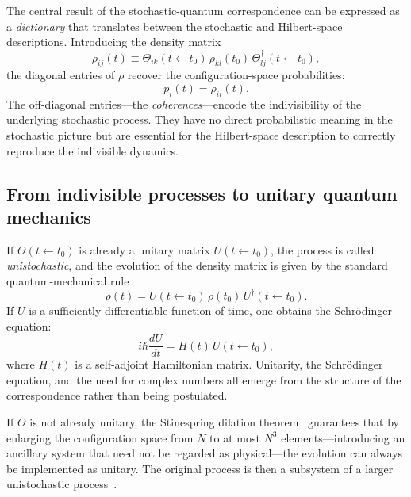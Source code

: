 \documentclass[aps,prd,twocolumn,superscriptaddress,nofootinbib]{revtex4-2}
\begin{document}
The central result of the stochastic-quantum correspondence can be expressed as a \emph{dictionary} that translates between the stochastic and Hilbert-space descriptions. Introducing the density matrix
\begin{equation}
\rho_{ij}(t) \equiv \Theta_{ik}(t \leftarrow t_0)\, \rho_{kl}(t_0)\, \Theta^{\dagger}_{lj}(t \leftarrow t_0),
\label{eq:density_evolution}
\end{equation}
the diagonal entries of $\rho$ recover the configuration-space probabilities:
\begin{equation}
p_i(t) = \rho_{ii}(t).
\label{eq:diagonal}
\end{equation}
The off-diagonal entries---the \emph{coherences}---encode the indivisibility of the underlying stochastic process. They have no direct probabilistic meaning in the stochastic picture but are essential for the Hilbert-space description to correctly reproduce the indivisible dynamics.

\subsection{From indivisible processes to unitary quantum mechanics}

If $\Theta(t \leftarrow t_0)$ is already a unitary matrix $U(t \leftarrow t_0)$, the process is called \emph{unistochastic}, and the evolution of the density matrix is given by the standard quantum-mechanical rule
\begin{equation}
\rho(t) = U(t \leftarrow t_0)\, \rho(t_0)\, U^{\dagger}(t \leftarrow t_0).
\label{eq:unitary_evolution}
\end{equation}
If $U$ is a sufficiently differentiable function of time, one obtains the Schr\"{o}dinger equation:
\begin{equation}
i\hbar \frac{dU}{dt} = H(t)\, U(t \leftarrow t_0),
\label{eq:schrodinger}
\end{equation}
where $H(t)$ is a self-adjoint Hamiltonian matrix. Unitarity, the Schr\"{o}dinger equation, and the need for complex numbers all emerge from the structure of the correspondence rather than being postulated.

If $\Theta$ is not already unitary, the Stinespring dilation theorem~\cite{Stinespring1955} guarantees that by enlarging the configuration space from $N$ to at most $N^3$ elements---introducing an ancillary system that need not be regarded as physical---the evolution can always be implemented as unitary. The original process is then a subsystem of a larger unistochastic process~\cite{Barandes2025SQC,Barandes2025SQT}.
\end{document}
